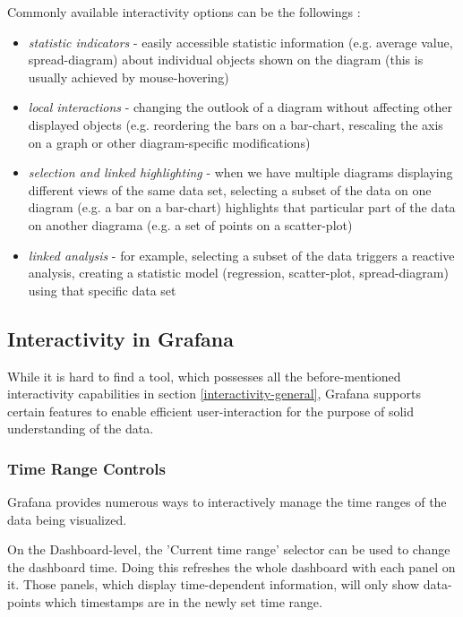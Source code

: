 Commonly available interactivity options can be the followings \cite{visual-analysis}:
\begin{itemize}
	\item \emph{statistic indicators} - easily accessible statistic information (e.g. average value, spread-diagram) about individual objects shown on the diagram (this is usually achieved by mouse-hovering)
	\item \emph{local interactions} - changing the outlook of a diagram without affecting other displayed objects (e.g. reordering the bars on a bar-chart, rescaling the axis on a graph or other diagram-specific modifications)
	\item \emph{selection and linked highlighting} - when we have multiple diagrams displaying different views of the same data set, selecting a subset of the data on one diagram (e.g. a bar on a bar-chart) highlights that particular part of the data on another diagrama (e.g. a set of points on a scatter-plot)
	\item \emph{linked analysis} - for example, selecting a subset of the data triggers a reactive analysis, creating a statistic model (regression, scatter-plot, spread-diagram) using that specific data set
\end{itemize}

\subsection{Interactivity in Grafana}

While it is hard to find a tool, which possesses all the before-mentioned interactivity capabilities in section \ref{interactivity-general}, Grafana supports certain features to enable efficient user-interaction for the purpose of solid understanding of the data.


\subsubsection{Time Range Controls} \label{grafana-time-range-controls}

Grafana provides numerous ways to interactively manage the time ranges of the data being visualized. \cite{grafana-time-range-controls}

On the Dashboard-level, the 'Current time range' selector can be used to change the dashboard time. Doing this refreshes the whole dashboard with each panel on it. Those panels, which display time-dependent information, will only show data-points which timestamps are in the newly set time range.

